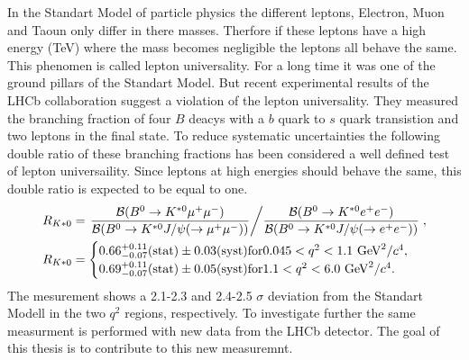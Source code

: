 \documentclass[english]{uzhpub}
\begin{document}
In the Standart Model of particle physics the different leptons, Electron, Muon and Taoun only differ in there masses. Therfore if these leptons have a high energy (TeV) where the mass becomes negligible the leptons all behave the same. This phenomen is called lepton universality. For a long time it was one of the ground pillars of the Standart Model. But recent experimental results of the LHCb collaboration \cite{bib:LU} suggest a violation of the lepton universality. They measured the branching fraction of four $B$ deacys with a $b$ quark to $s$ quark transistion and two leptons in the final state. To reduce systematic uncertainties the following double ratio of these branching fractions has been considered a well defined test of lepton universaility. Since leptons at high energies should behave the same, this double ratio is expected to be equal to one.
\begin{equation}
  \begin{split}
  R_{K*0} &= \left. \dfrac{\mathcal{B}(B^0 \rightarrow K^{*0} \mu^+ \mu^-)}{\mathcal{B}(B^0 \rightarrow K^{*0} J/\psi(\rightarrow \mu^+ \mu^-))} \middle/   \dfrac{\mathcal{B}(B^0 \rightarrow K^{*0} e^+ e^-)}{\mathcal{B} ( B^0 \rightarrow K^{*0} J/\psi(\rightarrow e^+ e^-))}  \right. , \\
  R_{K*0} &=   \begin{cases}
    0.66^{+0.11}_{-0.07} (\text{stat}) \pm 0.03 (\text{syst}) \text{for} 0.045 < q^2 < 1.1 \text{ GeV}^2/c^4, \\
    0.69^{+0.11}_{-0.07} (\text{stat}) \pm 0.05 (\text{syst}) \text{for} 1.1 < q^2 < 6.0 \text{ GeV}^2/c^4.
\end{cases}
\end{split}
\end{equation}
The mesurement shows a 2.1-2.3 and 2.4-2.5 $\sigma$ deviation from the Standart Modell in the two $q^2$ regions, respectively.
To investigate further the same measurment is performed with new data from the LHCb detector. The goal of this thesis is to contribute to this new measuremnt.
\end{document}
